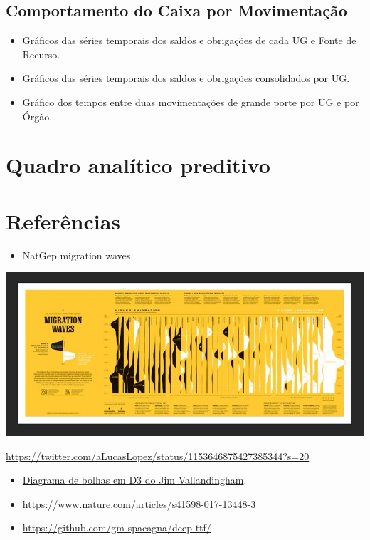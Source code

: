 \documentclass[]{book}
\providecommand{\tightlist}{%
  \setlength{\itemsep}{0pt}\setlength{\parskip}{0pt}}
\begin{document}
\hypertarget{comportamento-do-caixa-por-movimentacao}{%
\section{Comportamento do Caixa por Movimentação}\label{comportamento-do-caixa-por-movimentacao}}

\begin{itemize}
\tightlist
\item
  Gráficos das séries temporais dos saldos e obrigações de cada UG e Fonte de Recurso.
\item
  Gráficos das séries temporais dos saldos e obrigações consolidados por UG.
\item
  Gráfico dos tempos entre duas movimentações de grande porte por UG e por Órgão.
\end{itemize}

\hypertarget{quadro-analitico-preditivo}{%
\chapter{Quadro analítico preditivo}\label{quadro-analitico-preditivo}}

\hypertarget{referencias}{%
\chapter*{Referências}\label{referencias}}

\begin{itemize}
\tightlist
\item
  NatGep migration waves
\end{itemize}

\includegraphics{natgeo.jpg}

\url{https://twitter.com/aLucasLopez/status/1153646875427385344?s=20}

\begin{itemize}
\item
  \href{https://vallandingham.me/bubble_charts_with_d3v4.html}{Diagrama de bolhas em D3 do Jim Vallandingham}.
\item
  \url{https://www.nature.com/articles/s41598-017-13448-3}
\item
  \url{https://github.com/gm-spacagna/deep-ttf/}
\end{itemize}


\end{document}
